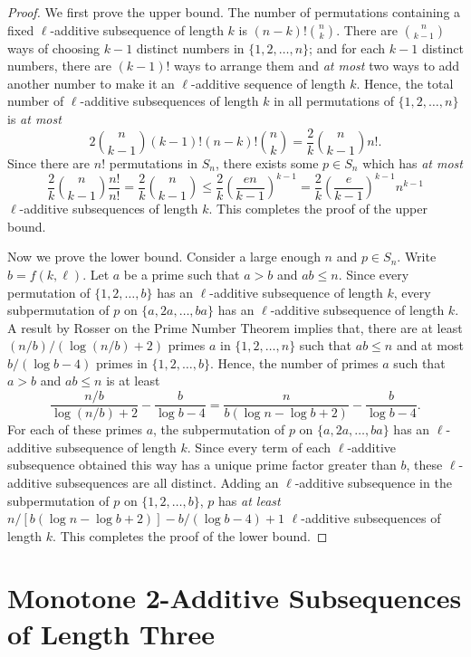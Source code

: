 \documentclass[10pt,a4paper]{amsart}
\begin{document}
\begin{proof}
We first prove the upper bound. The number of permutations containing a fixed $\ell$-additive subsequence of length $k$ is $(n-k)!{n \choose k}$. There are ${n\choose k-1}$ ways of choosing $k-1$ distinct numbers in $\{1,2,\ldots,n\}$; and for each $k-1$ distinct numbers, there are $(k-1)!$ ways to arrange them and \textit{at most} two ways to add another number to make it an $\ell$-additive sequence of length $k$. Hence, the total number of $\ell$-additive subsequences of length $k$ in all permutations of $\{1,2,\ldots,n\}$ is \textit{at most} 
    \[
    2{n\choose k-1}(k-1)!(n-k)!{n \choose k}=\frac{2}{k}{n\choose k-1}n!.
    \]
Since there are $n!$ permutations in $S_{n}$, there exists some $p\in S_n$ which has \textit{at most} \[\frac{2}{k}{n\choose k-1}\frac{n!}{n!}=\frac{2}{k}{n\choose k-1}\leq\frac{2}{k}\left(\frac{en}{k-1}\right)^{k-1}=\frac{2}{k}\left(\frac{e}{k-1}\right)^{k-1}n^{k-1}\]
$\ell$-additive subsequences of length $k$. This completes the proof of the upper bound.

Now we prove the lower bound. Consider a large enough $n$ and $p\in S_n$. Write $b=f(k,\ell)$. Let $a$ be a prime such that $a>b$ and $ab\leq n$. Since every permutation of $\{1,2,\ldots,b\}$ has an $\ell$-additive subsequence of length $k$, every subpermutation of $p$ on $\{a,2a,\ldots,ba\}$ has an $\ell$-additive subsequence of length $k$. A result by Rosser \cite{Rosser1941} on the Prime Number Theorem \cite[p.~274]{Nathanson2000} implies that, there are at least $(n/b)/(\log(n/b)+2)$ primes $a$ in $\{1,2,\ldots,n\}$ such that $ab\leq n$  and at most $b/(\log b-4)$ primes in $\{1,2,\ldots,b\}$. Hence, the number of primes $a$ such that $a>b$ and $ab\leq n$ is at least
\[
\frac{n/b}{\log(n/b)+2}-\frac{b}{\log b-4}=\frac{n}{b(\log n-\log b+2)}-\frac{b}{\log b-4}.
\]
For each of these primes $a$, the subpermutation of $p$ on $\{a,2a,\ldots,ba\}$ has an $\ell$-additive subsequence of length $k$. Since every term of each $\ell$-additive subsequence obtained this way has a unique prime factor greater than $b$, these $\ell$-additive subsequences are all distinct. Adding an $\ell$-additive subsequence in the subpermutation of $p$ on $\{1,2,\ldots,b\}$, $p$ has \textit{at least} $n/[b(\log n-\log b+2)]-b/(\log b-4)+1$ $\ell$-additive subsequences of length $k$. This completes the proof of the lower bound.
\end{proof} 



\section{Monotone 2-Additive Subsequences of Length Three}\label{Section:Monotone2-Add}
\end{document}
